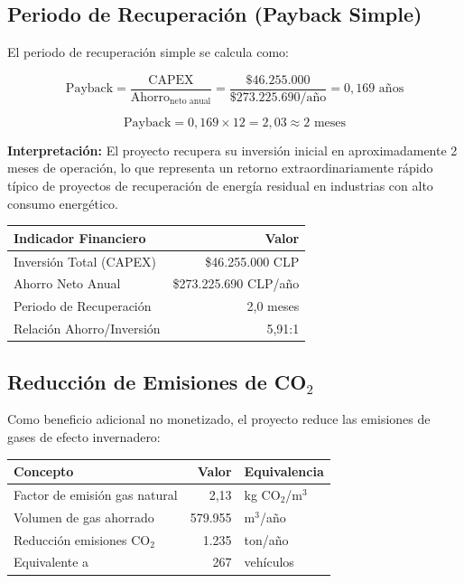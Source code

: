 \documentclass[12pt,a4paper]{article}
\begin{document}
\subsection{Periodo de Recuperación (Payback Simple)}

El periodo de recuperación simple se calcula como:

\begin{equation}
\text{Payback} = \frac{\text{CAPEX}}{\text{Ahorro}_{\text{neto anual}}} = \frac{\text{\$46.255.000}}{\text{\$273.225.690/año}} = 0{,}169 \text{ años}
\end{equation}

\begin{equation}
\text{Payback} = 0{,}169 \times 12 = 2{,}03 \approx 2 \text{ meses}
\end{equation}

\textbf{Interpretación:} El proyecto recupera su inversión inicial en aproximadamente 2 meses de operación, lo que representa un retorno extraordinariamente rápido típico de proyectos de recuperación de energía residual en industrias con alto consumo energético.

\begin{table}[h]
\centering
\begin{tabular}{lr}
\toprule
\textbf{Indicador Financiero} & \textbf{Valor} \\
\midrule
Inversión Total (CAPEX) & \$46.255.000 CLP \\
Ahorro Neto Anual & \$273.225.690 CLP/año \\
Periodo de Recuperación & 2,0 meses \\
Relación Ahorro/Inversión & 5,91:1 \\
\bottomrule
\end{tabular}
\end{table}

\subsection{Reducción de Emisiones de CO$_2$}

Como beneficio adicional no monetizado, el proyecto reduce las emisiones de gases de efecto invernadero:

\begin{table}[h]
\centering
\begin{tabular}{lrl}
\toprule
\textbf{Concepto} & \textbf{Valor} & \textbf{Equivalencia} \\
\midrule
Factor de emisión gas natural & 2,13 & kg CO$_2$/m$^3$ \\
Volumen de gas ahorrado & 579.955 & m$^3$/año \\
Reducción emisiones CO$_2$ & 1.235 & ton/año \\
Equivalente a & 267 & vehículos \\
\bottomrule
\end{tabular}
\end{table}
\end{document}
